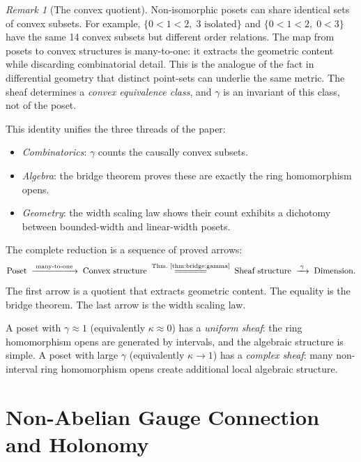 \documentclass[11pt,a4paper]{article}
\theoremstyle{plain}
\theoremstyle{definition}
\theoremstyle{remark}
\newtheorem{remark}[theorem]{Remark}
\begin{document}
\begin{remark}[The convex quotient]
Non-isomorphic posets can share identical sets of convex subsets.
For example, $\{0 < 1 < 2,\; 3\text{ isolated}\}$ and $\{0 < 1 < 2,\; 0 < 3\}$ have the same 14 convex subsets but different order relations.
The map from posets to convex structures is many-to-one: it extracts the geometric content while discarding combinatorial detail.
This is the analogue of the fact in differential geometry that distinct point-sets can underlie the same metric.
The sheaf determines a \emph{convex equivalence class}, and $\gamma$ is an invariant of this class, not of the poset.
\end{remark}

This identity unifies the three threads of the paper:
\begin{itemize}[nosep]
\item \emph{Combinatorics}: $\gamma$ counts the causally convex subsets.
\item \emph{Algebra}: the bridge theorem proves these are exactly the ring homomorphism opens.
\item \emph{Geometry}: the width scaling law shows their count exhibits a dichotomy between bounded-width and linear-width posets.
\end{itemize}

\noindent The complete reduction is a sequence of proved arrows:
\[
\text{Poset} \;\xrightarrow{\;\text{many-to-one}\;}\; \text{Convex structure} \;\stackrel{\text{Thm.~\ref{thm:bridge:gamma}}}{=\!=\!=\!=\!=\!=}\; \text{Sheaf structure} \;\xrightarrow{\;\gamma\;}\; \text{Dimension.}
\]
The first arrow is a quotient that extracts geometric content.
The equality is the bridge theorem.
The last arrow is the width scaling law.

A poset with $\gamma \approx 1$ (equivalently $\kappa \approx 0$) has a \emph{uniform sheaf}: the ring homomorphism opens are generated by intervals, and the algebraic structure is simple.
A poset with large $\gamma$ (equivalently $\kappa \to 1$) has a \emph{complex sheaf}: many non-interval ring homomorphism opens create additional local algebraic structure.


\section{Non-Abelian Gauge Connection and Holonomy}\label{sec:holonomy}
\end{document}

